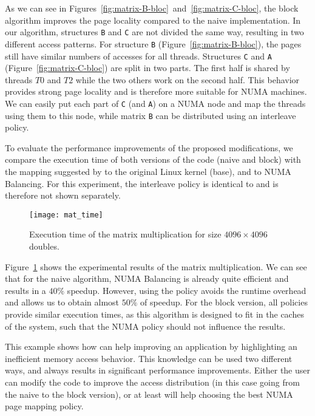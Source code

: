 As we can see in Figures~\ref{fig:matrix-B-bloc}~and~\ref{fig:matrix-C-bloc}, the block algorithm improves the page
locality compared to the naive implementation. In our algorithm, structures \texttt{B}
and \texttt{C} are not divided the same way, resulting in two different access patterns. For structure \texttt{B} (Figure~\ref{fig:matrix-B-bloc}), the pages still
have similar numbers of accesses for all threads. Structures \texttt{C} and
\texttt{A} (Figure~\ref{fig:matrix-C-bloc}) are split in two parts. The first half
is shared by threads $T0$ and $T2$ while the two others work on the second
half. This behavior provides strong page locality and is therefore more
suitable for NUMA machines. We can easily put each part of \texttt{C} (and
\texttt{A}) on a NUMA node and map the threads using them to this node, while matrix
\texttt{B} can be distributed using an interleave policy.

To evaluate the performance improvements of the proposed modifications, we compare the execution
time of both versions of the code (naive and block) with the mapping suggested by \TABARNAC to the original Linux kernel (base), and to NUMA Balancing.
For this experiment, the interleave policy is identical to \TABARNAC and is therefore not shown separately.


\begin{figure}[!t]
    \centering
    \texttt{[image: mat\_time]}
    \caption{Execution time of the matrix multiplication for size $4096\times 4096$ doubles.}
    \label{fig:matrix-res}
\end{figure}

Figure~\ref{fig:matrix-res} shows the experimental results of the matrix multiplication. We can see that for
the naive algorithm, NUMA Balancing is already quite efficient and results in a $40\%$
speedup. However, using the \TABARNAC policy avoids the runtime overhead and
allows us to obtain almost $50\%$ of speedup. For the block version, all policies
provide similar execution times, as this algorithm is designed to fit in the
caches of the system, such that the NUMA policy should not influence the results.

This example shows
how \TABARNAC can help improving an application by highlighting an inefficient
memory access behavior. This knowledge can be used two different ways, and always
results in significant performance improvements. Either the user can modify the code to
improve the access distribution (in this case going from the naive to the block version),
or at least \TABARNAC will help choosing the best NUMA page mapping policy.

